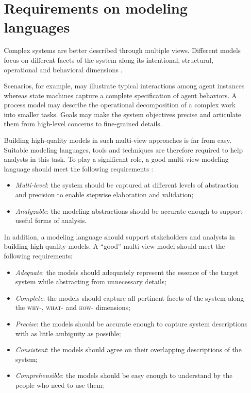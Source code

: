 \section[Requirements on modeling languages]{Requirements on modeling languages\label{section:intro-requirements}}

Complex systems are better described through multiple views. Different models focus on different facets of the system along its intentional, structural, operational and behavioral dimensions \cite{Rumbaugh:1991, Finkelstein:1992, VanLamsweerde:2009}. 

Scenarios, for example, may illustrate typical interactions among agent instances whereas state machines capture a complete specification of agent behaviors. A process model may describe the operational decomposition of a complex work into smaller tasks. Goals may make the system objectives precise and articulate them from high-level concerns to fine-grained details.

Building high-quality models in such multi-view approaches is far from easy. Suitable modeling languages, tools and techniques are therefore required to help analysts in this task. To play a significant role, a good multi-view modeling language should meet the following requirements \cite{VanLamsweerde:2009}:

\begin{itemize}
\item \emph{Multi-level}: the system should be captured at different levels of abstraction and precision to enable stepwise elaboration and validation;
\item \emph{Analyzable}: the modeling abstractions should be accurate enough to support useful forms of analysis.
\end{itemize}

In addition, a modeling language should support stakeholders and analysts in building high-quality models. A ``good'' multi-view model should meet the following requirements:

\begin{itemize}
\item \emph{Adequate}: the models should adequately represent the essence of the target system while abstracting from unnecessary details;
\item \emph{Complete}: the models should capture all pertinent facets of the system along the \textsc{why-}, \textsc{what-} and \textsc{how-} dimensions;
\item \emph{Precise}: the models should be accurate enough to capture system descriptions with as little ambiguity as possible;
\item \emph{Consistent}: the models should agree on their overlapping descriptions of the system;
\item \emph{Comprehensible}: the models should be easy enough to understand by the people who need to use them;
\end{itemize}

